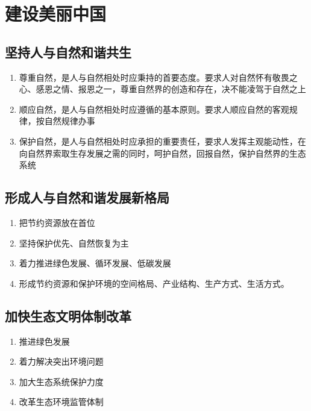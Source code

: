\section{建设美丽中国}
    \subsection{坚持人与自然和谐共生}
        \begin{enumerate}
            \item 尊重自然，是人与自然相处时应秉持的首要态度。要求人对自然怀有敬畏之心、感恩之情、报恩之一，尊重自然界的创造和存在，决不能凌驾于自然之上
            \item 顺应自然，是人与自然相处时应遵循的基本原则。要求人顺应自然的客观规律，按自然规律办事
            \item 保护自然，是人与自然相处时应承担的重要责任，要求人发挥主观能动性，在向自然界索取生存发展之需的同时，呵护自然，回报自然，保护自然界的生态系统
        \end{enumerate}

    \subsection{形成人与自然和谐发展新格局}
        \begin{enumerate}
            \item 把节约资源放在首位
            \item 坚持保护优先、自然恢复为主
            \item 着力推进绿色发展、循环发展、低碳发展
            \item 形成节约资源和保护环境的空间格局、产业结构、生产方式、生活方式。
        \end{enumerate}

    \subsection{加快生态文明体制改革}
        \begin{enumerate}
            \item 推进绿色发展
            \item 着力解决突出环境问题
            \item 加大生态系统保护力度
            \item 改革生态环境监管体制
        \end{enumerate}
